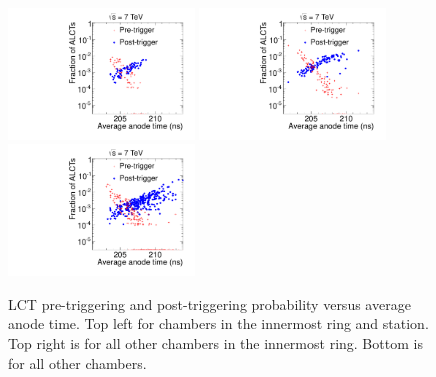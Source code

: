 \begin{figure}
  \begin{center}
      \includegraphics[clip=true, trim=0.0cm 0cm 0.0cm 0cm, width=0.44\textwidth]{figures/timing/ME11_Anode_vs_all3}
      \includegraphics[clip=true, trim=0.0cm 0cm 0.0cm 0cm, width=0.44\textwidth]{figures/timing/Ring1_not11_Anode_vs_all3} \\
      \includegraphics[clip=true, trim=0.0cm 0cm 0.0cm 0cm, width=0.44\textwidth]{figures/timing/Ring2_Anode_vs_all3} \\
      \caption[LCT pre-triggering and post-triggering probability versus average anode time.]
      {LCT pre-triggering and post-triggering probability versus average anode time. 
Top left for chambers in the innermost ring and station. Top right is for all other chambers in the innermost ring.
Bottom is for all other chambers.
        }
      \label{fig:AnodevsprePostLCT}
  \end{center}
\end{figure}

